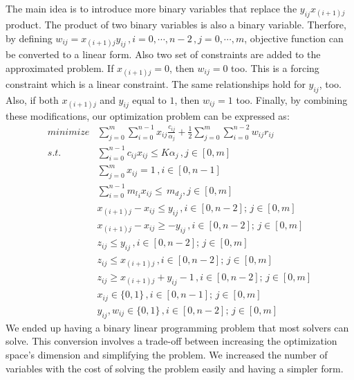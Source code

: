 \documentclass[lettersize,journal]{IEEEtran}
\begin{document}
The main idea is to introduce more binary variables that replace the $y_{ij}x_{(i+1)j}$ product. The product of two binary variables is also a binary variable. Therfore, by defining $w_{ij} = x_{(i+1)j}y_{ij} \, , i=0,\cdots,n-2 \, , j=0,\cdots,m$, objective function can be converted to a linear form. Also two set of constraints are added to the approximated problem. If $x_{(i+1)j} = 0$, then $w_{ij} = 0$ too. This is a forcing constraint which is a linear constraint. The same relationships hold for $y_{ij}$, too. Also, if both $x_{(i+1)j}$ and $y_{ij}$ equal to $1$, then $w_{ij} = 1$ too. Finally, by combining these modifications, our optimization problem can be expressed as:
\begin{align}
\label{final_form}
minimize &\sum_{j=0}^{m}\sum_{i=0}^{n-1} x_{ij}\frac{c_{ij}}{\alpha_j} + \frac{1}{2}\sum_{j=0}^{m} \sum_{i=0}^{n-2} w_{ij} r_{ij} \\
s.t. \quad & \sum_{i=0}^{n-1} c_{ij} x_{ij} \leq K \alpha_j \, , j \in [0, m] \nonumber \\
\quad & \sum_{j=0}^{m} x_{ij} = 1 \, , i \in [0, n-1] \nonumber \\
\quad & \sum_{i=0}^{n-1} {m_l}_i x_{ij} \leq \, {m_d}_j  , j \in [0, m] \nonumber \\
\quad & x_{(i+1)j}-x_{ij} \leq y_{ij} \, , i \in [0, n-2]; \, j \in [0,m]  \nonumber \\
\quad & x_{(i+1)j}-x_{ij} \geq -y_{ij} \, , i \in [0, n-2]; \, j \in[0,m]  \nonumber \\
\quad & z_{ij} \leq y_{ij} \, , i \in [0, n-2]; \, j \in [0, m]  \nonumber \\
\quad & z_{ij} \leq x_{(i+1)j} \, , i \in [0, n-2]; \, j \in [0, m]  \nonumber \\
\quad & z_{ij} \geq x_{(i+1)j} + y_{ij} - 1 \, , i \in [0, n-2]; \, j \in [0, m]  \nonumber \\
\quad & x_{ij} \in \{0,1\} \, , i \in [0, n-1]; \, j \in [0,m] \nonumber \\
\quad & y_{ij}, w_{ij} \in \{0,1\} \, , i \in [0, n-2]; \, j \in [0,m] \nonumber
\end{align}
We ended up having a binary linear programming problem that most solvers can solve. This conversion involves a trade-off between increasing the optimization space's dimension and simplifying the problem. We increased the number of variables with the cost of solving the problem easily and having a simpler form.
\end{document}
